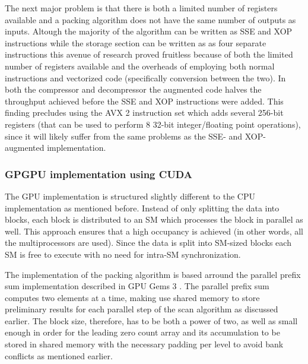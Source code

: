   The next major problem is that there is both a limited number of registers available and a packing algorithm does not have the same number of outputs as inputs. Altough
  the majority of the algorithm can be written as SSE and XOP instructions while the storage section can be written as as four separate instructions this avenue of research
  proved fruitless because of both the limited number of registers available and the overheads of employing both normal instructions and vectorized code (specifically conversion
  between the two). In both the compressor and decompressor the augmented code halves the throughput achieved before the SSE and XOP instructions were added. This finding precludes
  using the AVX 2 instruction set which adds several 256-bit registers (that can be used to perform 8 32-bit integer/floating point operations), since it will likely suffer from
  the same problems as the SSE- and XOP-augmented implementation.
  \subsubsection{GPGPU implementation using CUDA}
  The GPU implementation is structured slightly different to the CPU implementation as mentioned before. Instead of only splitting the data into blocks, each block is distributed to
  an SM which processes the block in parallel as well. This approach ensures that a high occupancy is achieved (in other words, all the multiprocessors are used). Since the data is
  split into SM-sized blocks each SM is free to execute with no need for intra-SM synchronization. 
  
  The implementation of the packing algorithm is based arround the parallel prefix sum implementation described in GPU Gems 3 \cite{harris2007parallel}. The parallel prefix sum computes two 
  elements at a time, making use shared memory to store preliminary results for each parallel step of the scan algorithm as discussed earlier. The block size, therefore, has to be both a power of 
  two, as well as small enough in order for the leading zero count array and its accumulation to be stored in shared memory with the necessary padding per level to avoid bank conflicts as mentioned 
  earlier.
  
